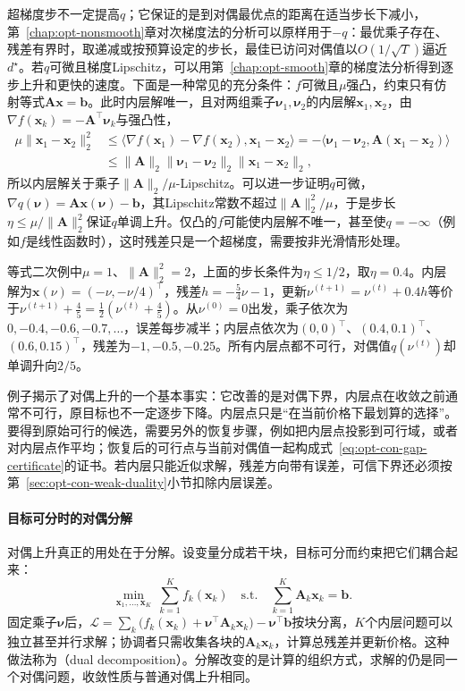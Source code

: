 超梯度步不一定提高$q$；它保证的是到对偶最优点的距离在适当步长下减小，第~\ref{chap:opt-nonsmooth}章对次梯度法的分析可以原样用于$-q$：最优乘子存在、残差有界时，取递减或按预算设定的步长，最佳已访问对偶值以$O(1/\sqrt T)$逼近$d^\star$。若$q$可微且梯度Lipschitz，可以用第~\ref{chap:opt-smooth}章的梯度法分析得到逐步上升和更快的速度。下面是一种常见的充分条件：$f$可微且$\mu$强凸，约束只有仿射等式$\bm A\bm x=\bm b$。此时内层解唯一，且对两组乘子$\bm\nu_1,\bm\nu_2$的内层解$\bm x_1,\bm x_2$，由$\nabla f(\bm x_k)=-\bm A^\top\bm\nu_k$与强凸性，
\[
  \begin{aligned}
    \mu\lVert\bm x_1-\bm x_2\rVert_2^2&\leq\langle\nabla f(\bm x_1)-\nabla f(\bm x_2),\bm x_1-\bm x_2\rangle
    =-\langle\bm\nu_1-\bm\nu_2,\bm A(\bm x_1-\bm x_2)\rangle\\
    &\leq\lVert\bm A\rVert_2\lVert\bm\nu_1-\bm\nu_2\rVert_2\lVert\bm x_1-\bm x_2\rVert_2,
  \end{aligned}
\]
所以内层解关于乘子$\lVert\bm A\rVert_2/\mu$-Lipschitz。可以进一步证明$q$可微，$\nabla q(\bm\nu)=\bm A\bm x(\bm\nu)-\bm b$，其Lipschitz常数不超过$\lVert\bm A\rVert_2^2/\mu$，于是步长$\eta\leq\mu/\lVert\bm A\rVert_2^2$保证$q$单调上升。仅凸的$f$可能使内层解不唯一，甚至使$q=-\infty$（例如$f$是线性函数时），这时残差只是一个超梯度，需要按非光滑情形处理。

\begin{example}[等式二次例的对偶上升]
\label{ex:opt-con-dual-ascent}
等式二次例中$\mu=1$、$\lVert\bm A\rVert_2^2=2$，上面的步长条件为$\eta\leq1/2$，取$\eta=0.4$。内层解为$\bm x(\nu)=(-\nu,-\nu/4)^\top$，残差$h=-\frac54\nu-1$，更新$\nu^{(t+1)}=\nu^{(t)}+0.4h$等价于$\nu^{(t+1)}+\frac45=\frac12(\nu^{(t)}+\frac45)$。从$\nu^{(0)}=0$出发，乘子依次为$0,-0.4,-0.6,-0.7,\dots$，误差每步减半；内层点依次为$(0,0)^\top$、$(0.4,0.1)^\top$、$(0.6,0.15)^\top$，残差为$-1,-0.5,-0.25$。所有内层点都不可行，对偶值$q(\nu^{(t)})$却单调升向$2/5$。
\end{example}

例子揭示了对偶上升的一个基本事实：它改善的是对偶下界，内层点在收敛之前通常不可行，原目标也不一定逐步下降。内层点只是“在当前价格下最划算的选择”。要得到原始可行的候选，需要另外的恢复步骤，例如把内层点投影到可行域，或者对内层点作平均；恢复后的可行点与当前对偶值一起构成式~\eqref{eq:opt-con-gap-certificate}的证书。若内层只能近似求解，残差方向带有误差，可信下界还必须按第~\ref{sec:opt-con-weak-duality}小节扣除内层误差。

\paragraph{目标可分时的对偶分解}
对偶上升真正的用处在于分解。设变量分成若干块，目标可分而约束把它们耦合起来：
\[
  \min_{\bm x_1,\dots,\bm x_K}\ \sum_{k=1}^Kf_k(\bm x_k)\quad\text{s.t.}\quad\sum_{k=1}^K\bm A_k\bm x_k=\bm b.
\]
固定乘子$\bm\nu$后，$\mathcal L=\sum_k\bigl(f_k(\bm x_k)+\bm\nu^\top\bm A_k\bm x_k\bigr)-\bm\nu^\top\bm b$按块分离，$K$个内层问题可以独立甚至并行求解；协调者只需收集各块的$\bm A_k\bm x_k$，计算总残差并更新价格。这种做法称为（dual decomposition）。分解改变的是计算的组织方式，求解的仍是同一个对偶问题，收敛性质与普通对偶上升相同。

